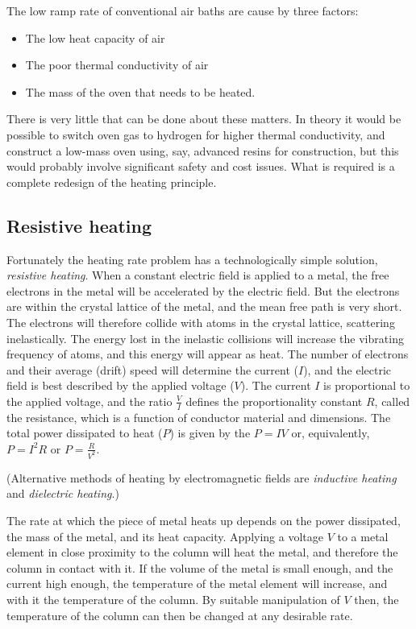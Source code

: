 The low ramp rate of conventional air baths are cause by three factors:

\begin{itemize}
	\item The low heat capacity of air
	\item The poor thermal conductivity of air
	\item The mass of the oven that needs to be heated. 
\end{itemize}

There is very little that can be done about these matters. In theory it would be
possible to switch oven gas to hydrogen for higher thermal conductivity, and
construct a low-mass oven using, say, advanced resins for construction, but this
would probably involve significant safety and cost issues. What is required is a
complete redesign of the heating principle.

\subsection{Resistive heating}

Fortunately the heating rate problem has a technologically simple solution,
\textit{resistive heating}. When a constant electric field is applied to a
metal, the free electrons in the metal will be accelerated by the electric
field. But the electrons are within the crystal lattice of the metal, and the
mean free path is very short. The electrons will therefore collide with atoms in
the crystal lattice, scattering inelastically. The energy lost in the inelastic
collisions will increase the vibrating frequency of atoms, and this energy will
appear as heat. The number of electrons and their average (drift) speed will
determine the current ($I$), and the electric field is best described by the
applied voltage ($V$). The current $I$ is proportional to the applied voltage,
and the ratio $\frac{V}{I}$ defines the proportionality constant $R$, called the
resistance, which is a function of conductor material and dimensions. The total
power dissipated to heat ($P$) is given by the $P=IV$ or, equivalently, $P=I^2R$
or $P=\frac{R}{V^2}$.

(Alternative methods of heating by electromagnetic fields are \textit{inductive
heating} and \textit{dielectric heating}.)

The rate at which the piece of metal heats up depends on the power dissipated,
the mass of the metal, and its heat capacity. Applying a voltage \(V\) to a
metal element in close proximity to the column will heat the metal, and
therefore the column in contact with it. If the volume of the metal is small
enough, and the current high enough, the temperature of the metal element will
increase, and with it the temperature of the column. By suitable manipulation of
\(V\) then, the temperature of the column can then be changed at any desirable
rate.

